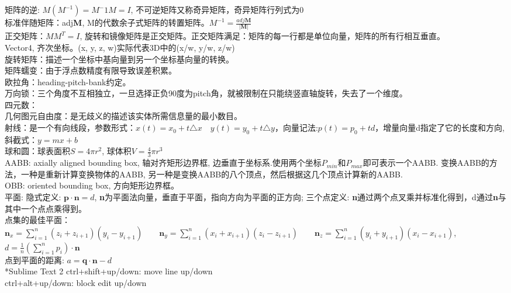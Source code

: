 \documentclass[UTF8]{ctexart}
\makeatletter
\renewcommand{\section}{\@startsection{section}{1}{0mm}
  {-\baselineskip}{0.5\baselineskip}{\bf\leftline}}
\makeatother
\begin{document}
矩阵的逆: $M(M^{-1}) = M^-1M = I$, 不可逆矩阵又称奇异矩阵，奇异矩阵行列式为0\\
标准伴随矩阵：adj\textbf{M}, M的代数余子式矩阵的转置矩阵。$M^{-1} = \frac{adj\textbf{M}}{|\textbf{M}|}$\\
正交矩阵：\textbf{$MM^{T} = I$}, 旋转和镜像矩阵是正交矩阵。正交矩阵满足：矩阵的每一行都是单位向量，矩阵的所有行相互垂直。\\
Vector4, 齐次坐标。(x, y, z, w)实际代表3D中的(x/w, y/w, z/w)\\
旋转矩阵：描述一个坐标中基向量到另一个坐标基向量的转换。\\
矩阵蠕变：由于浮点数精度有限导致误差积累。\\
欧拉角：heading-pitch-bank约定。\\
万向锁：三个角度不互相独立，一旦选择正负90度为pitch角，就被限制在只能绕竖直轴旋转，失去了一个维度。\\
四元数：\\
几何图元自由度：是无歧义的描述该实体所需信息量的最小数目。\\
射线：是一个有向线段，参数形式：$x(t)=x_0+t\triangle x \quad y(t)=y_0+t\triangle y$，向量记法:$p(t)=p_0 + td$，增量向量d指定了它的长度和方向, 斜截式：$y=mx+b$\\
球和圆：球表面积$S=4\pi r^2$, 球体积$V=\frac{4}{3}\pi r^3$\\
AABB: axially aligned bounding box, 轴对齐矩形边界框, 边垂直于坐标系.使用两个坐标$P_{min}$和$P_{max}$即可表示一个AABB. 变换AABB的方法，一种是重新计算变换物体的AABB, 另一种是变换AABB的八个顶点，然后根据这几个顶点计算新的AABB.\\ 
OBB: oriented bounding box, 方向矩形边界框。\\
平面: 隐式定义: $\textbf{p}\cdot \textbf{n}=d$, \textbf{n}为平面法向量，垂直于平面，指向方向为平面的正方向; 三个点定义: \textbf{n}通过两个点叉乘并标准化得到，d通过\textbf{n}与其中一个点点乘得到。\\
点集的最佳平面：$\textbf{n}_x=\sum_{i=1}^{n}(z_{i}+z_{i+1})(y_{i}-y_{i+1})\qquad \textbf{n}_y=\sum_{i=1}^{n}(x_{i}+x_{i+1})(z_{i}-z_{i+1})\qquad \textbf{n}_z=\sum_{i=1}^{n}(y_{i}+y_{i+1})(x_{i}-x_{i+1})$, $d=\frac{1}{n}(\sum_{i=1}^{n}p_{i})\cdot \textbf{n}$\\
点到平面的距离: $a=\textbf{q}\cdot \textbf{n}-d$\\
\section*{Sublime Text 2}
\noindent ctrl+shift+up/down: move line up/down\\
ctrl+alt+up/down: block edit up/down\\
\end{document}

